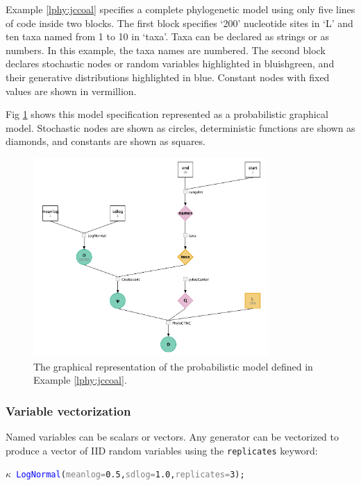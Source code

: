 \documentclass[10pt,letterpaper,table]{article}
\theoremstyle{definition}
\begin{document}
\medskip{}

Example \ref{lphy:jccoal} specifies a complete phylogenetic model using only five lines of code inside two blocks. 
The first block specifies `200' nucleotide sites in `L' and ten taxa named from 1 to 10 in `taxa'. 
Taxa can be declared as strings or as numbers. 
In this example, the taxa names are numbered. 
The second block declares stochastic nodes or random variables highlighted in bluishgreen, and their generative distributions highlighted in blue. 
Constant nodes with fixed values are shown in vermillion.  

Fig \ref{fig:jccoalPGM} shows this model specification represented as a probabilistic graphical model. 
Stochastic nodes are shown as circles, deterministic functions are shown as diamonds, and constants are shown as squares.


\begin{figure}
   \includegraphics[width=0.8\textwidth]{figs_plos/Fig1.png}
  \caption{The graphical representation of the probabilistic model defined in Example \ref{lphy:jccoal}.} 
  \label{fig:jccoalPGM}
\end{figure}

\subsubsection{Variable vectorization}

Named variables can be scalars or vectors. 
Any generator can be vectorized to produce a vector of IID random variables using the \texttt{replicates} keyword:

{\small
\begin{alltt}
    \textcolor{bluishgreen}{\(\kappa\)} ~ \textcolor{blue}{LogNormal}(\textcolor{gray}{meanlog=}\textcolor{constant}{0.5}, \textcolor{gray}{sdlog=}\textcolor{constant}{1.0}, \textcolor{gray}{replicates=}\textcolor{constant}{3});
\end{alltt}
}
\end{document}
